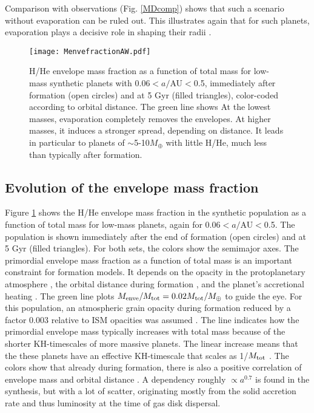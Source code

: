 \documentclass[]{emulateapj}
\def\mearth{M_{\oplus}}
\begin{document}
Comparison with observations (Fig.   \ref{MDcomp}) shows that such a scenario without evaporation can be ruled out. This illustrates again that for such planets, evaporation plays a decisive role in shaping their radii \citep{Owen2013}. 

\begin{figure}
\begin{center}
 \texttt{[image: MenvefractionAW.pdf]}
 \caption{H/He envelope mass fraction as a function of total mass for low-mass synthetic planets with 0.06$<a/$AU$<$0.5, immediately after formation (open circles) and at 5 Gyr (filled triangles), color-coded according to orbital distance. The green line shows At the lowest masses, evaporation completely removes the envelopes. At higher masses, it induces a stronger spread, depending on distance. It leads in particular to planets of $\sim$5-10$\mearth$ with little H/He, much less than typically after formation.}
  \label{MenvefractionAW}
  \end{center}
\end{figure}

\subsection{{Evolution of the envelope mass fraction}}
Figure  \ref{MenvefractionAW} shows the H/He envelope mass fraction in the synthetic population as a function of total mass for low-mass planets, again for 0.06$<$$a/$AU$<$0.5. The population is shown immediately after the end of formation (open circles) and at 5 Gyr (filled triangles). For both sets, the colors show the semimajor axes. The primordial envelope mass fraction as a function of total mass  is an important constraint for formation  models. It depends on the opacity in the protoplanetary atmosphere \citep{Podolak2003,Ormel2014,Mordasini2014}, the orbital distance during formation \citep{Ikoma2012}, and the planet's accretional heating \citep{Ikoma2000}. The green line plots  $M_{\rm enve}/M_{\rm tot}=0.02 M_{\rm tot}/\mearth$ to guide the eye. For this population, an atmospheric grain opacity during formation reduced by a factor 0.003 relative to ISM opacities was assumed \citep{Mordasini2014}. The line indicates how the primordial envelope mass typically increases with total mass because of the shorter KH-timescales of more massive planets. The linear increase means that the these planets  have an effective KH-timescale that scales as 1/$M_{\rm tot}$ \citep{Mordasini2014}. The colors show that already during formation, there is also a positive correlation of envelope mass and orbital distance \citep{Ikoma2012,Lee2015}. A dependency roughly $\propto a^{0.7}$ is found in the synthesis, but with a lot of scatter, originating mostly from the solid accretion rate and thus luminosity at the time of gas disk dispersal. 
\end{document}
